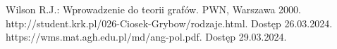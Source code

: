 
\begin{thebibliography}{4}
 Wilson R.J.: Wprowadzenie do teorii grafów. PWN, Warszawa 2000.
 http://student.krk.pl/026-Ciosek-Grybow/rodzaje.html. Dostęp 26.03.2024.
 https://wms.mat.agh.edu.pl/\texttildelow md/ang-pol.pdf. Dostęp 29.03.2024.
\end{thebibliography}